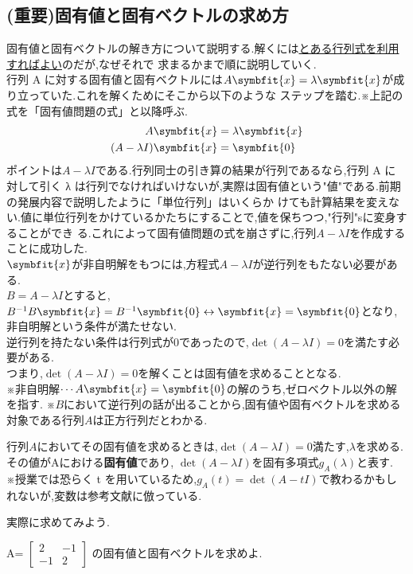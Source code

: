\subsection{(重要)固有値と固有ベクトルの求め方}
固有値と固有ベクトルの解き方について説明する.解くには\underline{とある行列式を利用すればよい}のだが,なぜそれで
求まるかまで順に説明していく.\\
行列 A に対する固有値と固有ベクトルには$A\symbfit{x}=\lambda\symbfit{x}$が成り立っていた.これを解くためにそこから以下のような
ステップを踏む.※上記の式を「固有値問題の式」と以降呼ぶ.
\begin{align*}
    A\symbfit{x} &=\lambda\symbfit{x}\\
    (A-\lambda I)\symbfit{x}&=\symbfit{0}
\end{align*}
ポイントは$A-\lambda I$である.行列同士の引き算の結果が行列であるなら,行列 A に
対して引く λ は行列でなければいけないが,実際は固有値という"値"である.前期の発展内容で説明したように「単位行列」はいくらか
けても計算結果を変えない.値に単位行列をかけているかたちにすることで,値を保ちつつ,"行列"sに変身することができ
る.これによって固有値問題の式を崩さずに,行列$A-\lambda I$を作成することに成功した.\\
$\symbfit{x}$が非自明解をもつには,方程式$A-\lambda I$が逆行列をもたない必要がある.\\
$B=A-\lambda I$とすると,$B^{-1}B\symbfit{x}=B^{-1}\symbfit{0}\leftrightarrow\symbfit{x}=\symbfit{0}$となり,非自明解という条件が満たせない.\\
逆行列を持たない条件は行列式が0であったので,$\det(A-\lambda I)=0$を満たす必要がある.\\
つまり,$\det(A-\lambda I)=0$を解くことは固有値を求めることとなる.\\
※非自明解$\cdots A\symbfit{x}=\symbfit{0}$の解のうち,ゼロベクトル以外の解を指す.
※$B$において逆行列の話が出ることから,固有値や固有ベクトルを求める対象である行列$A$は正方行列だとわかる.
\hypertarget{eig}{}
\begin{tcolorbox}[colframe=black!80,colback=white,title=固有多項式$g_{A}(\lambda)$]
    行列$A$においてその固有値を求めるときは,$\det(A-\lambda I)=0$満たす,$\lambda$を求める.その値がAにおける\textbf{固有値}であり,
    $\det(A-\lambda I)$を固有多項式$g_{A}(\lambda)$と表す.\\
    ※授業では恐らく t を用いているため,$g_A(t) = \det(A - tI)$で教わるかもしれないが,変数は参考文献に倣っている.
\end{tcolorbox}
実際に求めてみよう.
\begin{framed}
A=
$\begin{bmatrix}
    2 & -1 \\
    -1 & 2
\end{bmatrix}$
の固有値と固有ベクトルを求めよ.
\end{framed}
